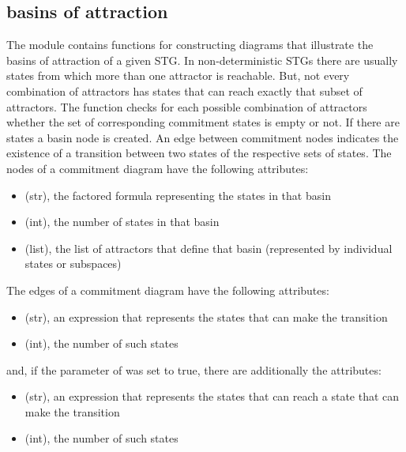 \documentclass[letterpaper,10pt,english]{sphinxmanual}
\begin{document}
\subsection{basins of attraction}
\label{\detokenize{Manual:basins-of-attraction}}
The module {\hyperref[\detokenize{Basins:basins}]{}} contains functions for constructing diagrams that illustrate the basins of attraction of a given STG.
In non-deterministic STGs there are usually states from which more than one attractor is reachable.
But, not every combination of attractors has states that can reach exactly that subset of attractors.
The function {\hyperref[\detokenize{Basins:commitment-diagram}]{}} checks for each possible combination of attractors whether the set of corresponding commitment states is empty or not.
If there are states a basin node is created.
An edge between commitment nodes indicates the existence of a transition between two states of the respective sets of states.
The nodes of a commitment diagram have the following attributes:
\begin{itemize}
\item {} 
 (str), the factored formula representing the states in that basin

\item {} 
 (int), the number of states in that basin

\item {} 
 (list), the list of attractors that define that basin (represented by individual states or subspaces)

\end{itemize}

The edges of a commitment diagram have the following attributes:
\begin{itemize}
\item {} 
 (str), an expression that represents the states that can make the transition

\item {} 
 (int), the number of such states

\end{itemize}

and, if the parameter  of {\hyperref[\detokenize{Basins:commitment-diagram}]{}} was set to true, there are additionally the attributes:
\begin{itemize}
\item {} 
 (str), an expression that represents the states that can reach a state that can make the transition

\item {} 
 (int), the number of such states

\end{itemize}
\end{document}
